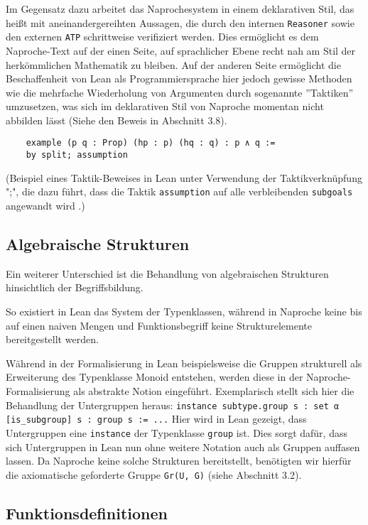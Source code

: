 \documentclass[a4paper,12pt]{scrartcl}
\newcommand{\ls}[1]{\lstinline|#1|}
\begin{document}
Im Gegensatz dazu arbeitet das Naprochesystem in einem deklarativen Stil, das heißt mit aneinandergereihten Aussagen, die durch den internen \verb!Reasoner! sowie den externen \verb!ATP! schrittweise verifiziert werden. Dies ermöglicht es dem Naproche-Text auf der einen Seite, auf sprachlicher Ebene recht nah am Stil der herkömmlichen Mathematik zu bleiben. Auf der anderen Seite ermöglicht die Beschaffenheit von Lean als Programmiersprache hier jedoch gewisse Methoden wie die mehrfache Wiederholung von Argumenten durch sogenannte ''Taktiken'' umzusetzen, was sich im deklarativen Stil von Naproche momentan nicht abbilden lässt (Siehe den Beweis in Abschnitt 3.8).

\lstset{language=lean}
\begin{lstlisting}
    example (p q : Prop) (hp : p) (hq : q) : p ∧ q :=
    by split; assumption
\end{lstlisting}

(Beispiel eines Taktik-Beweises in Lean unter Verwendung der Taktikverknüpfung ";", die dazu führt, dass die Taktik \lstinline{assumption} auf alle verbleibenden \lstinline{subgoals} angewandt wird \cite{bibtex.e}.)

\subsection{Algebraische Strukturen}

Ein weiterer Unterschied ist die Behandlung von algebraischen Strukturen hinsichtlich der Begriffsbildung.

So existiert in Lean das System der Typenklassen, während in Naproche keine bis auf einen naiven Mengen und Funktionsbegriff keine Strukturelemente bereitgestellt werden.

Während in der Formalisierung in Lean beispielsweise die Gruppen strukturell als Erweiterung des Typenklasse Monoid entstehen, werden diese in der Naproche-Formalisierung als abstrakte Notion eingeführt. Exemplarisch stellt sich hier die Behandlung der Untergruppen heraus:
\lstinline{instance subtype.group s : set α [is_subgroup] s : group s := ...} Hier wird in Lean gezeigt, dass Untergruppen eine \ls{instance} der Typenklasse \ls{group} ist. Dies sorgt dafür, dass sich Untergruppen in Lean nun ohne weitere Notation auch als Gruppen auffasen lassen.
Da Naproche keine solche Strukturen bereitstellt, benötigten wir hierfür die axiomatische geforderte Gruppe \verb!Gr(U, G)! (siehe Abschnitt 3.2).

\subsection{Funktionsdefinitionen}
\end{document}
